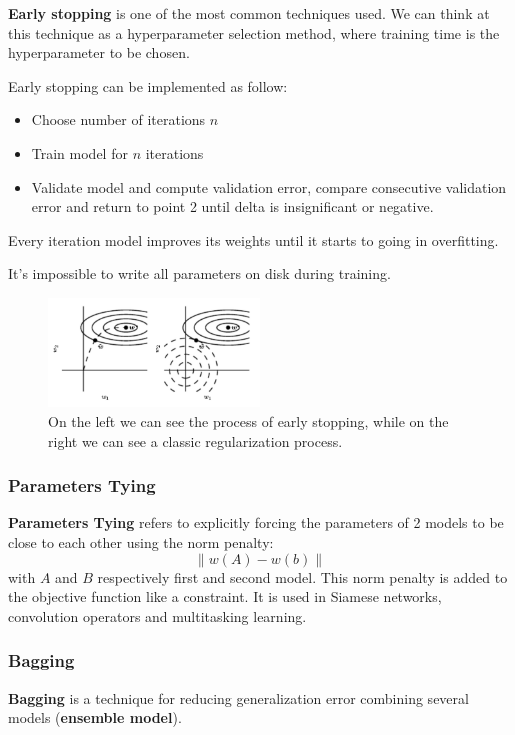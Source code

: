 \textbf{Early stopping} is one of the most common techniques used. We can think
at this technique as a hyperparameter selection method, where training time is
the hyperparameter to be chosen.

Early stopping can be implemented as follow:
\begin{itemize}
    \item Choose number of iterations $n$
    \item Train model for $n$ iterations
    \item Validate model and compute validation error, compare consecutive validation
          error and return to point 2 until delta is insignificant or negative.
\end{itemize}
Every iteration model improves its weights until it starts to going in overfitting.
\begin{note}
    It's impossible to write all parameters on disk during training.
\end{note}
\begin{figure}[!ht]
    \centering
    \includegraphics[width=0.5\textwidth]{img/early_stopping.png}
    \caption{On the left we can see the process of early stopping, while on the
        right we can see a classic regularization process.}
    \label{fig:earlystopping}
\end{figure}
\subsubsection{Parameters Tying}
\textbf{Parameters Tying} refers to explicitly forcing the parameters of 2 models
to be close to each other using the norm penalty:
\begin{equation}
    \|w(A)- w(b)\|
\end{equation}
with $A$ and $B$ respectively first and second model. This norm penalty is added
to the objective function like a constraint. It is used in Siamese networks,
convolution operators and multitasking learning.
\subsubsection{Bagging}
\textbf{Bagging} is a technique for reducing generalization error combining
several models (\textbf{ensemble model}).

